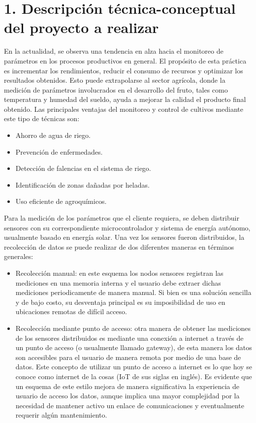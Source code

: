 \documentclass[
11pt, %
codirector, %
]{charter}
\begin{document}
\section{1. Descripción técnica-conceptual del proyecto a realizar}
\label{sec:descripcion}

En la actualidad, se observa una tendencia en alza hacia el monitoreo de parámetros en los procesos productivos en general. El propósito de esta práctica es incrementar los rendimientos, reducir el consumo de recursos y optimizar los resultados obtenidos. Esto puede extrapolarse al sector agrícola, donde la medición de parámetros involucrados en el desarrollo del fruto, tales como temperatura y humedad del sueldo, ayuda a mejorar la calidad el producto final obtenido. Las principales ventajas del monitoreo y control de cultivos mediante este tipo de técnicas son:

\begin{itemize}
\item Ahorro de agua de riego.
\item Prevención de enfermedades.
\item Detección de falencias en el sistema de riego.
\item Identificación de zonas dañadas por heladas.
\item Uso eficiente de agroquímicos.
\end{itemize}

Para la medición de los parámetros que el cliente requiera, se deben distribuir sensores con su correspondiente microcontrolador y sistema de energía autónomo, usualmente basado en energía solar. Una vez los sensores fueron distribuidos, la recolección de datos se puede realizar de dos diferentes maneras en términos generales:

\begin{itemize}
\item Recolección manual: en este esquema los nodos sensores registran las mediciones en una memoria interna y el usuario debe extraer dichas mediciones periodicamente de manera manual. Si bien es una solución sencilla y de bajo costo, su desventaja principal es su imposibilidad de uso en ubicaciones remotas de difícil acceso.

\item Recolección mediante punto de acceso: otra manera de obtener las mediciones de los sensores distribuidos es mediante una conexión a internet a través de un punto de acceso (o usualmente llamado gateway), de esta manera los datos son accesibles para el usuario de manera remota por medio de una base de datos. Este concepto de utilizar un punto de acceso a internet es lo que hoy se conoce como internet de la cosas (IoT de sus siglas en inglés). Es evidente que un esquema de este estilo mejora de manera significativa la experiencia de usuario de acceso los datos, aunque implica una mayor complejidad por la necesidad de mantener activo un enlace de comunicaciones y eventualmente requerir algún mantenimiento.
\end{itemize}
\end{document}
